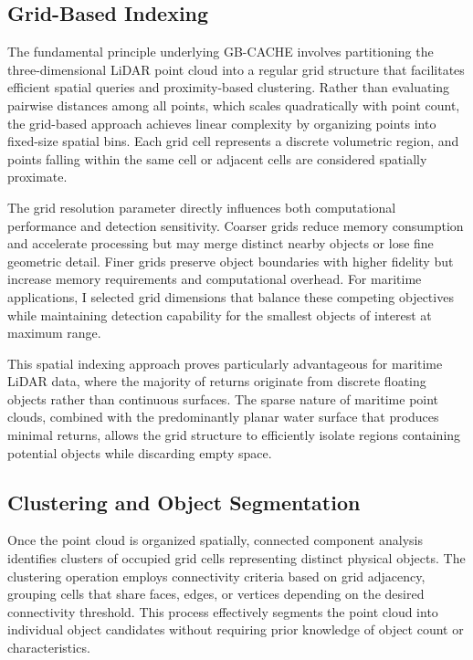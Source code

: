 \documentclass{erauthesis}
\begin{document}
\subsection{Grid-Based Indexing} \label{sec:grid-based_indexing}

The fundamental principle underlying \ac{GB-CACHE} involves partitioning the three-dimensional \ac{LiDAR} point cloud into a regular grid structure that facilitates efficient spatial queries and proximity-based clustering.
Rather than evaluating pairwise distances among all points, which scales quadratically with point count, the grid-based approach achieves linear complexity by organizing points into fixed-size spatial bins.
Each grid cell represents a discrete volumetric region, and points falling within the same cell or adjacent cells are considered spatially proximate.

The grid resolution parameter directly influences both computational performance and detection sensitivity.
Coarser grids reduce memory consumption and accelerate processing but may merge distinct nearby objects or lose fine geometric detail.
Finer grids preserve object boundaries with higher fidelity but increase memory requirements and computational overhead.
For maritime applications, I selected grid dimensions that balance these competing objectives while maintaining detection capability for the smallest objects of interest at maximum range.

This spatial indexing approach proves particularly advantageous for maritime \ac{LiDAR} data, where the majority of returns originate from discrete floating objects rather than continuous surfaces.
The sparse nature of maritime point clouds, combined with the predominantly planar water surface that produces minimal returns, allows the grid structure to efficiently isolate regions containing potential objects while discarding empty space.

\subsection{Clustering and Object Segmentation} \label{sec:cluster_and_seg}

Once the point cloud is organized spatially, connected component analysis identifies clusters of occupied grid cells representing distinct physical objects.
The clustering operation employs connectivity criteria based on grid adjacency, grouping cells that share faces, edges, or vertices depending on the desired connectivity threshold.
This process effectively segments the point cloud into individual object candidates without requiring prior knowledge of object count or characteristics.
\end{document}
